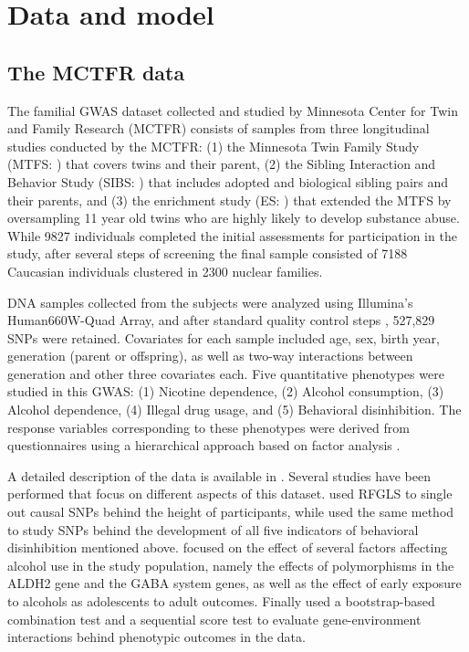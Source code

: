 \section{Data and model}
\label{sec:modelSection}

\subsection{The MCTFR data}
The familial GWAS dataset collected and studied by Minnesota Center for Twin and Family Research (MCTFR)\citep{LiEtal11, MillerEtal12, McGueEtal13} consists of samples from three longitudinal studies conducted by the MCTFR: (1) the Minnesota Twin Family Study (MTFS: \cite{IaconoEtal99}) that covers twins and their parent, (2) the Sibling Interaction and Behavior Study (SIBS: \cite{McGueEtal07}) that includes adopted and biological sibling pairs and their parents, and (3) the enrichment study (ES: \cite{KeyesEtal09}) that extended the MTFS by oversampling 11 year old twins who are highly likely to develop substance abuse. While 9827 individuals completed the initial assessments for participation in the study, after several steps of screening the final sample consisted of 7188 Caucasian individuals clustered in 2300 nuclear families. %

DNA samples collected from the subjects were analyzed using Illumina's Human660W-Quad Array, and after standard quality control steps \citep{MillerEtal12}, 527,829 SNPs were retained. Covariates for each sample included age, sex, birth year, generation (parent or offspring), as well as two-way interactions between generation and other three covariates each. Five quantitative phenotypes were studied in this GWAS: (1) Nicotine dependence, (2) Alcohol consumption, (3) Alcohol dependence, (4) Illegal drug usage, and (5) Behavioral disinhibition. The response variables corresponding to these phenotypes were derived from questionnaires using a hierarchical approach based on factor analysis \citep{HicksEtal11}.

A detailed description of the data is available  in \cite{MillerEtal12}. Several studies have been performed that focus on different aspects of this dataset. \cite{LiEtal11} used RFGLS to single out causal SNPs behind the height of participants, while \cite{McGueEtal13} used the same method to study SNPs behind the development of all five indicators of behavioral disinhibition mentioned above. \cite{IronsThesis12} focused on the effect of several factors affecting alcohol use in the study population, namely the effects of polymorphisms in the ALDH2 gene and the GABA system genes, as well as the effect of early exposure to alcohols as adolescents to adult outcomes. Finally \cite{CoombesThesis16} used a bootstrap-based combination test and a sequential score test to evaluate gene-environment interactions behind phenotypic outcomes in the data.

